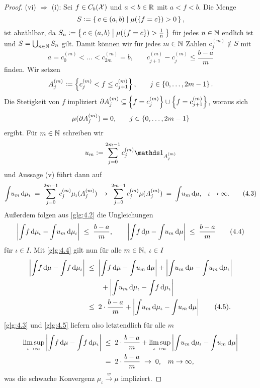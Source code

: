 \documentclass[../thesis/thesis.tex]{subfiles}
\begin{document}
\begin{proof}
		(vi) $\Rightarrow$ (i): Sei $f \in C_b(\mathcal{X})$ und $a < b \in \mathbb{R}$ 
		mit $a < f < b$. Die Menge
		$$S \vcentcolon = \left\{\, c \in (a, b) \; \middle| \; \mu(\left\{f = c\right\}) > 0 \,\right\} \text{,}$$
		ist abzählbar, da 
		$S_n \vcentcolon = \left\{\, c \in (a, b) \; \middle| \; \mu(\left\{f = c\right\}) > \frac{1}{n} \,\right\}$ 
		für jedes $n \in \mathbb{N}$ endlich ist und $S = \bigcup_{n \in \mathbb{N}} S_n$ gilt.
		Damit können wir für jedes $m \in \mathbb{N}$ Zahlen $c_j^{(m)} \notin S$ mit
		\[a = c_0^{(m)} < \dots < c_{2m}^{(m)} = 
		b \text{,} \qquad c_{j+1}^{(m)} - c_j^{(m)} \leq \frac{b-a}{m} 
		\label{glg:4.2} \tag{4.2}\]
		finden. Wir setzen
		$$A_j^{(m)} \vcentcolon = \left\{c_j^{(m)} < f \leq c_{j+1}^{(m)}\right\}\text{,}
		\qquad j \in \left\{0,\dots,2m-1\right\} \text{.}$$ 
		Die Stetigkeit von $f$ impliziert 
		$\partial A_j^{(m)} \subseteq \left\{f = c_j^{(m)}\right\} \cup \left\{f = c_{j+1}^{(m)}\right\}$, 
		woraus sich 
		$$\mu(\partial A_j^{(m)}) = 0 \text{,} \qquad j \in \left\{0,\dots,2m-1\right\}$$
		ergibt. Für $m \in \mathbb{N}$ schreiben wir
		$$u_m \defby \sum_{j=0}^{2m-1} c_j^{(m)} \indfct_{A_j^{(m)}}$$
		und Aussage (v) führt dann auf
		\[\int_{} \, u_m \, \mathrm{d}\mu_\iota \; = \; \sum_{j=0}^{2m-1} c_j^{(m)} \mu_\iota(A_j^{(m)}) 
		\; \to \; \sum_{j=0}^{2m-1} c_j^{(m)} \mu(A_j^{(m)}) \; = \; 
		\int_{} \, u_m \, \mathrm{d}\mu \text{,} \quad \iota \to \infty \text{.} 
		\label{glg:4.3} \tag{4.3}\]
		Außerdem folgen aus \eqref{glg:4.2} die Ungleichungen
		\[\left| \int_{} \, f \, \mathrm{d}\mu_\iota - \int_{} \, u_m \, \mathrm{d}\mu_\iota \right| \; \leq \; 
		\frac{b-a}{m} \text{,} \qquad 
		\left| \int_{} \, f \, \mathrm{d}\mu - \int_{} \, u_m \, \mathrm{d}\mu \right| \; \leq \; 
		\frac{b-a}{m} \label{glg:4.4} \tag{4.4}\]
		für $\iota \in I$.
		Mit \eqref{glg:4.4} gilt nun für alle $m \in \mathbb{N}, \; \iota \in I$
		\begin{align*}
			\left| \int_{} \, f \, \mathrm{d}\mu - \int_{} \, f \, \mathrm{d}\mu_\iota \right| \; &\leq \; 
			\left| \int_{} \, f \, \mathrm{d}\mu - \int_{} \, u_m \, \mathrm{d}\mu \right| + 
			\left| \int_{} \, u_m \, \mathrm{d}\mu - \int_{} \, u_m \, \mathrm{d}\mu_\iota \right| \\ & \qquad + 
			\left| \int_{} \, u_m \, \mathrm{d}\mu_\iota - \int_{} \, f \, \mathrm{d}\mu_\iota \right| \\
			&\leq \; 2 \cdot \frac{b-a}{m} + \left| \int_{} \, u_m \, \mathrm{d}\mu_\iota - 
			\int_{} \, u_m \, \mathrm{d}\mu \right| \label{glg:4.5} \tag{4.5}\text{.}
		\end{align*}
		\eqref{glg:4.3} und \eqref{glg:4.5} liefern also letztendlich für alle $m$
		\begin{align*}
			\limsup_{\iota \to \infty} \left| \int_{} \, f \, \mathrm{d}\mu - 
			\int_{} \, f \, \mathrm{d}\mu_\iota \right|
			\; &\leq \; 2 \cdot \frac{b-a}{m} + 
			\limsup_{\iota \to \infty} \left| \int_{} \, u_m \, \mathrm{d}\mu_\iota - 
			\int_{} \, u_m \, \mathrm{d}\mu \right| \\
			&= \; 2 \cdot \frac{b-a}{m} \; \to \; 0 \text{,} 
			\quad m \to \infty \text{,}
		\end{align*}
		was die schwache Konvergenz $\mu_\iota \xrightarrow{w} \mu$ impliziert.
	\end{proof}
\end{document}
